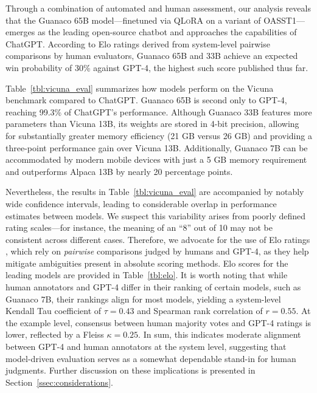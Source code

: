 Through a combination of automated and human assessment, our analysis reveals that the {Guanaco} 65B model—finetuned via \textsc{QLoRA} on a variant of OASST1—emerges as the leading open-source chatbot and approaches the capabilities of ChatGPT. According to Elo ratings derived from system-level pairwise comparisons by human evaluators, {Guanaco} 65B and 33B achieve an expected win probability of 30\% against GPT-4, the highest such score published thus far.

Table~\ref{tbl:vicuna_eval} summarizes how models perform on the Vicuna benchmark \cite{vicuna2023} compared to ChatGPT. {Guanaco} 65B is second only to GPT-4, reaching 99.3\% of ChatGPT’s performance. Although {Guanaco} 33B features more parameters than Vicuna 13B, its weights are stored in 4-bit precision, allowing for substantially greater memory efficiency (21 GB versus 26 GB) and providing a three-point performance gain over Vicuna 13B. Additionally, {Guanaco} 7B can be accommodated by modern mobile devices with just a 5 GB memory requirement and outperforms Alpaca 13B by nearly 20 percentage points.

Nevertheless, the results in Table~\ref{tbl:vicuna_eval} are accompanied by notably wide confidence intervals, leading to considerable overlap in performance estimates between models. We suspect this variability arises from poorly defined rating scales—for instance, the meaning of an “8” out of 10 may not be consistent across different cases. Therefore, we advocate for the use of Elo ratings \citep{elo1967proposed}, which rely on \textit{pairwise} comparisons judged by humans and GPT-4, as they help mitigate ambiguities present in absolute scoring methods. Elo scores for the leading models are provided in Table~\ref{tbl:elo}. It is worth noting that while human annotators and GPT-4 differ in their ranking of certain models, such as Guanaco 7B, their rankings align for most models, yielding a system-level Kendall Tau coefficient of $\tau=0.43$ and Spearman rank correlation of $r=0.55$. At the example level, consensus between human majority votes and GPT-4 ratings is lower, reflected by a Fleiss $\kappa=0.25$. In sum, this indicates moderate alignment between GPT-4 and human annotators at the system level, suggesting that model-driven evaluation serves as a somewhat dependable stand-in for human judgments. Further discussion on these implications is presented in Section~\ref{ssec:considerations}.

